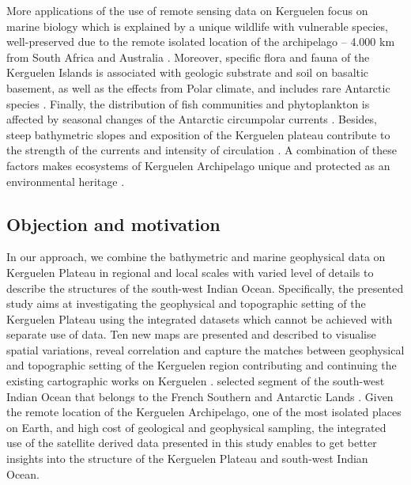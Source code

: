 \documentclass[geomatics,article,submit,pdftex,moreauthors]{Definitions/mdpi}
\begin{document}
More applications of the use of remote sensing data on Kerguelen focus on marine biology which is explained by a unique wildlife with vulnerable species, well-preserved due to the remote isolated location of the archipelago -- 4.000 km from South Africa and Australia  \cite{Rue1932b,fishes8040174}. Moreover, specific flora and fauna of the Kerguelen Islands is associated with geologic substrate and soil on basaltic basement, as well as the effects from Polar climate, and includes rare Antarctic species  \cite{Rue1932a,Paulian,Aubert3723}. Finally, the distribution of fish communities and phytoplankton is affected by seasonal changes of the Antarctic circumpolar currents \cite{Park2009,Damerell,MONGIN2008880,Park,Park2014,POLLARD20071915,Pauthenet,Penna}. Besides, steep bathymetric slopes and exposition of the Kerguelen plateau contribute to the strength of the currents and intensity of circulation \cite{Rietbroek}. A combination of these factors makes ecosystems of Kerguelen Archipelago unique and protected as an environmental heritage \cite{Sombetzkib,Sombetzkia,Naim}. 

\subsection{Objection and motivation}

In our approach, we combine the bathymetric and marine geophysical data on Kerguelen Plateau in regional and local scales with varied level of details to describe the structures of the south-west Indian Ocean. Specifically, the presented study aims at investigating the geophysical and topographic setting of the Kerguelen Plateau using the integrated datasets which cannot be achieved with separate use of data. Ten new maps are presented and described to visualise spatial variations, reveal correlation and capture the matches between geophysical and topographic setting of the Kerguelen region contributing and continuing the existing cartographic works on Kerguelen \cite{Nougier,Petit,RECQ1989133}.
selected segment of the south-west Indian Ocean that belongs to the French Southern and Antarctic Lands \cite{Rue1931,Faivre,Dupouy}. Given the remote location of the Kerguelen Archipelago, one of the most isolated places on Earth, and high cost of geological and geophysical sampling, the integrated use of the satellite derived data presented in this study enables to get better insights into the structure of the Kerguelen Plateau and south-west Indian Ocean.
\end{document}
